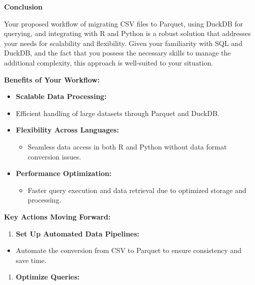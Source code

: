 \documentclass[
  american,
  10,
  a4paper,
]{book}
\providecommand{\tightlist}{%
  \setlength{\itemsep}{0pt}\setlength{\parskip}{0pt}}
\theoremstyle{definition}
\theoremstyle{remark}
\begin{document}
\textbf{Conclusion}

Your proposed workflow of migrating CSV files to Parquet, using DuckDB
for querying, and integrating with R and Python is a robust solution
that addresses your needs for scalability and flexibility. Given your
familiarity with SQL and DuckDB, and the fact that you possess the
necessary skills to manage the additional complexity, this approach is
well-suited to your situation.

\textbf{Benefits of Your Workflow:}

\begin{itemize}
\item
  \textbf{Scalable Data Processing:}
\item
  Efficient handling of large datasets through Parquet and DuckDB.
\item
  \textbf{Flexibility Across Languages:}

  \begin{itemize}
  \tightlist
  \item
    Seamless data access in both R and Python without data format
    conversion issues.
  \end{itemize}
\item
  \textbf{Performance Optimization:}

  \begin{itemize}
  \tightlist
  \item
    Faster query execution and data retrieval due to optimized storage
    and processing.
  \end{itemize}
\end{itemize}

\textbf{Key Actions Moving Forward:}

\begin{enumerate}
\def\labelenumi{\arabic{enumi}.}
\tightlist
\item
  \textbf{Set Up Automated Data Pipelines:}
\end{enumerate}

\begin{itemize}
\tightlist
\item
  Automate the conversion from CSV to Parquet to ensure consistency and
  save time.
\end{itemize}

\begin{enumerate}
\def\labelenumi{\arabic{enumi}.}
\setcounter{enumi}{1}
\tightlist
\item
  \textbf{Optimize Queries:}
\end{enumerate}
\end{document}
